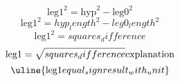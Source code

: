 \[\text{{{leg1}}}^{{2}}=\text{{{hyp}}}^{{2}}-\text{{{leg0}}}^{{2}}\]
\[\text{{{leg1}}}^{{2}}={hyp_length}^{{2}}-{leg0_length}^{{2}}\]
\[\text{{{leg1}}}^{{2}}={squares_difference}\]
\[\text{{{leg1}}}=\sqrt{{\mathstrut {squares_difference}}}\text{{{explanation}}}\]
\[\uline{{\text{{{leg1}}}{equal_sign}{result_with_unit}}}\]